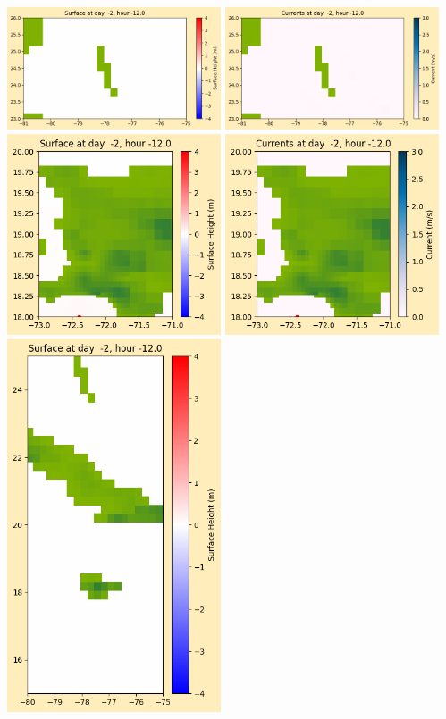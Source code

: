 \documentclass[11pt]{article}
\begin{document}
\vskip 10pt 
\includegraphics[width=0.475\textwidth]{frame0002fig1003.png}
\includegraphics[width=0.475\textwidth]{frame0002fig1004.png}
\vskip 10pt 
\includegraphics[width=0.475\textwidth]{frame0002fig1005.png}
\includegraphics[width=0.475\textwidth]{frame0002fig1006.png}
\vskip 10pt 
\includegraphics[width=0.475\textwidth]{frame0002fig1007.png}
\end{document}

